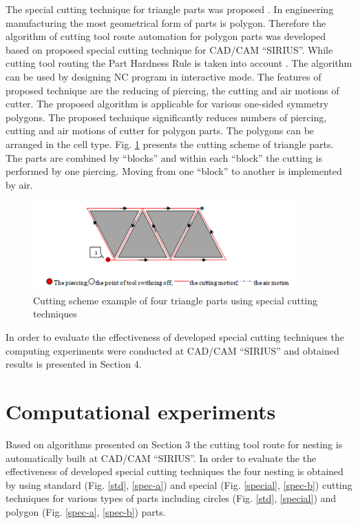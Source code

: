 \documentclass[runningheads]{llncs}
\begin{document}
The special cutting technique for triangle parts was proposed \cite{ru26}.
In engineering manufacturing the most geometrical form of parts is polygon.
Therefore the algorithm of cutting tool route automation for polygon parts
was developed based on proposed special cutting technique for CAD/CAM ``SIRIUS''.
While cutting tool routing the Part Hardness Rule is taken into account \cite{ru27}.
The algorithm can be used by designing NC program in interactive mode.
The features of proposed technique are the reducing of piercing,
the cutting and air motions of cutter.
The proposed algorithm is applicable for various one-sided symmetry polygons.
The proposed technique significantly reduces numbers of piercing,
cutting and air motions of cutter for polygon parts.
The polygons can be arranged in the cell type.
Fig. \ref{tri} presents the cutting scheme of triangle parts.
The parts are combined by ``blocks'' and within each ``block''
the cutting is performed by one piercing.
Moving from one ``block'' to another is implemented by air.

\begin{figure}
  \begin{center}
  \includegraphics[width=0.9\textwidth]{tri.png}
  \caption{Cutting scheme example of four triangle parts using special cutting techniques}
  \label{tri}
  \end{center}
\end{figure}

In order to evaluate the effectiveness
of developed special cutting techniques
the computing experiments were conducted at CAD/CAM ``SIRIUS''
and obtained results is presented in Section 4.

\section{Computational experiments}

Based on algorithms presented on Section 3
the cutting tool route for nesting is automatically built at CAD/CAM ``SIRIUS''.
In order to evaluate the the effectiveness of developed special cutting techniques
the four nesting is obtained by using standard (Fig. \ref{std}, \ref{spec-a})
and special (Fig. \ref{special}, \ref{spec-b})
cutting techniques for various types of parts including circles
(Fig. \ref{std}, \ref{special}) and polygon (Fig. \ref{spec-a}, \ref{spec-b}) parts.
\end{document}
